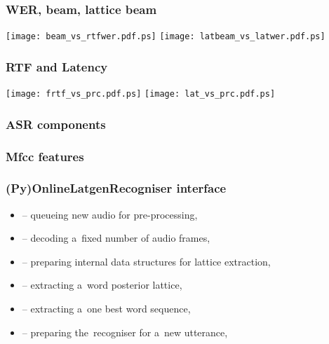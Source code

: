 \begin{frame}\frametitle{WER, beam, lattice beam} 
    \texttt{[image: beam\_vs\_rtfwer.pdf.ps]}
    \texttt{[image: latbeam\_vs\_latwer.pdf.ps]}
\end{frame}

\begin{frame}\frametitle{RTF and Latency} 
    \texttt{[image: frtf\_vs\_prc.pdf.ps]}
    \texttt{[image: lat\_vs\_prc.pdf.ps]}
\end{frame}

\begin{frame}\frametitle{ASR components} 
    
\end{frame}

\begin{frame}\frametitle{Mfcc features} 
    
    
\end{frame}


\begin{frame}\frametitle{(Py)OnlineLatgenRecogniser interface} 
    \begin{itemize}
        \item {} -- queueing new audio for pre-processing,
        \item {} -- decoding a~fixed number of audio frames,
        \item {} -- preparing internal data structures for lattice extraction,
        \item {} -- extracting a~word posterior lattice, 
        \item {} -- extracting a~one best word sequence,
        \item {} -- preparing the~recogniser for a~new utterance,
    \end{itemize}
\end{frame}



